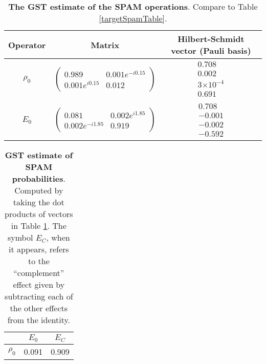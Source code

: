 \documentclass{article}[11pt]
\providecommand{\e}[1]{\ensuremath{\times 10^{#1}}}
\begin{document}
\begin{table}[h]
\begin{center}
\begin{tabular}[l]{|c|c|c|}
\hline
Operator & Matrix & Hilbert-Schmidt vector (Pauli basis) \\ \hline
$\rho_{0}$ & $ \left(\!\!\begin{array}{cc}
0.989 & 0.001e^{-i0.15} \\ 
0.001e^{i0.15} & 0.012
 \end{array}\!\!\right) $
 & $ \begin{array}{c}
0.708 \\ 
0.002 \\ 
3\e{-4} \\ 
0.691
 \end{array} $
 \\ \hline
$E_{0}$ & $ \left(\!\!\begin{array}{cc}
0.081 & 0.002e^{i1.85} \\ 
0.002e^{-i1.85} & 0.919
 \end{array}\!\!\right) $
 & $ \begin{array}{c}
0.708 \\ 
-0.001 \\ 
-0.002 \\ 
-0.592
 \end{array} $
 \\ \hline
\end{tabular}

\caption{\textbf{The GST estimate of the SPAM operations}.  Compare to Table \ref{targetSpamTable}.\label{bestGatesetSpamTable}}
\end{center}
\end{table}

\begin{table}[h]
\begin{center}
\begin{tabular}[l]{|c|c|c|}
\hline
 & $E_{0}$ & $E_C$ \\ \hline
$\rho_{0}$ & 0.091 & 0.909 \\ \hline
\end{tabular}

\caption{\textbf{GST estimate of SPAM probabilities}.  Computed by taking the dot products of vectors in Table \ref{bestGatesetSpamTable}.  The symbol $E_C$, when it appears, refers to the ``complement'' effect given by subtracting each of the other effects from the identity.\label{bestGatesetSpamParametersTable}}
\end{center}
\end{table}
\end{document}
